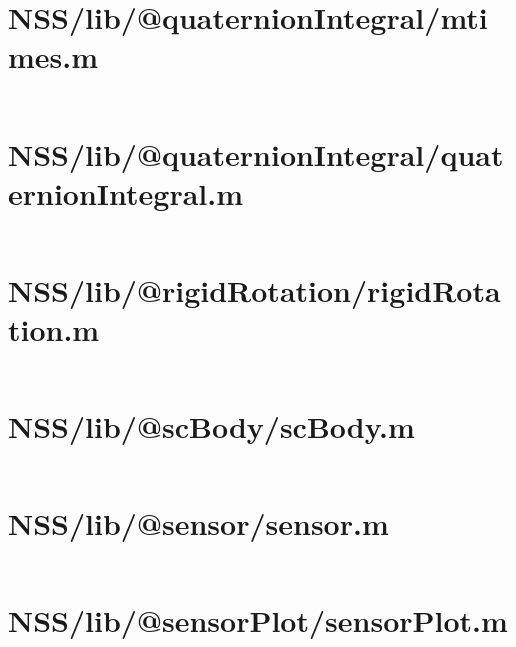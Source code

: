 \pagebreak
\section*{NSS/lib/@quaternionIntegral/mtimes.m}\label{code:NSS/lib/@quaternionIntegral/mtimes.m}
\inputminted[linenos,fontsize=\scriptsize]{matlab}{/home/dcouture/git/mathyourlife/TSatPy/beta_versions/matlab_object_oriented/lib/@quaternionIntegral/mtimes.m}

\pagebreak
\section*{NSS/lib/@quaternionIntegral/quaternionIntegral.m}\label{code:NSS/lib/@quaternionIntegral/quaternionIntegral.m}
\inputminted[linenos,fontsize=\scriptsize]{matlab}{/home/dcouture/git/mathyourlife/TSatPy/beta_versions/matlab_object_oriented/lib/@quaternionIntegral/quaternionIntegral.m}

\pagebreak
\section*{NSS/lib/@rigidRotation/rigidRotation.m}\label{code:NSS/lib/@rigidRotation/rigidRotation.m}
\inputminted[linenos,fontsize=\scriptsize]{matlab}{/home/dcouture/git/mathyourlife/TSatPy/beta_versions/matlab_object_oriented/lib/@rigidRotation/rigidRotation.m}

\pagebreak
\section*{NSS/lib/@scBody/scBody.m}\label{code:NSS/lib/@scBody/scBody.m}
\inputminted[linenos,fontsize=\scriptsize]{matlab}{/home/dcouture/git/mathyourlife/TSatPy/beta_versions/matlab_object_oriented/lib/@scBody/scBody.m}

\pagebreak
\section*{NSS/lib/@sensor/sensor.m}\label{code:NSS/lib/@sensor/sensor.m}
\inputminted[linenos,fontsize=\scriptsize]{matlab}{/home/dcouture/git/mathyourlife/TSatPy/beta_versions/matlab_object_oriented/lib/@sensor/sensor.m}

\pagebreak
\section*{NSS/lib/@sensorPlot/sensorPlot.m}\label{code:NSS/lib/@sensorPlot/sensorPlot.m}
\inputminted[linenos,fontsize=\scriptsize]{matlab}{/home/dcouture/git/mathyourlife/TSatPy/beta_versions/matlab_object_oriented/lib/@sensorPlot/sensorPlot.m}

